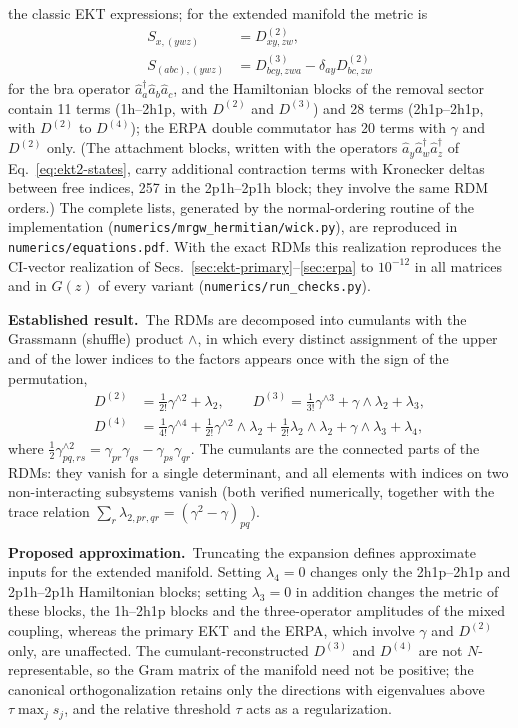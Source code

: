 \documentclass[aip,jcp,reprint,noshowkeys,superscriptaddress]{revtex4-1}
\newcommand{\Established}{\textbf{Established result.}\ }
\newcommand{\Proposed}{\textbf{Proposed approximation.}\ }
\begin{document}
the classic EKT expressions; for the extended manifold the metric is
\begin{align}
  S_{x,(ywz)}&=D^{(2)}_{xy,zw},
  \nonumber\\
  S_{(abc),(ywz)}&=D^{(3)}_{bcy,zwa}-\delta_{ay}D^{(2)}_{bc,zw}
  \label{eq:S-rdm}
\end{align}
for the bra operator $\hat a_a^\dagger\hat a_b\hat a_c$, and the
Hamiltonian blocks of the removal sector contain 11 terms (1h--2h1p,
with $D^{(2)}$ and $D^{(3)}$) and 28 terms (2h1p--2h1p, with $D^{(2)}$ to
$D^{(4)}$); the ERPA double commutator has 20 terms with $\gamma$ and
$D^{(2)}$ only.  (The attachment blocks, written with the operators
$\hat a_y\hat a_w^\dagger\hat a_z^\dagger$ of Eq.~\eqref{eq:ekt2-states},
carry additional contraction terms with Kronecker deltas between free
indices, 257 in the 2p1h--2p1h block; they involve the same RDM orders.)
The complete lists, generated by the normal-ordering routine of the
implementation (\texttt{numerics/mrgw\_hermitian/wick.py}), are reproduced
in \texttt{numerics/equations.pdf}.  With the exact RDMs this realization
reproduces the CI-vector realization of Secs.~\ref{sec:ekt-primary}--\ref{sec:erpa}
to $10^{-12}$ in all matrices and in $G(z)$ of every variant
(\texttt{numerics/run\_checks.py}).

\Established The RDMs are decomposed into cumulants with the Grassmann
(shuffle) product $\wedge$, in which every distinct assignment of the
upper and of the lower indices to the factors appears once with the sign
of the permutation,
\begin{align}
  D^{(2)}&=\tfrac1{2!}\gamma^{\wedge2}+\lambda_2,\qquad
  D^{(3)}=\tfrac1{3!}\gamma^{\wedge3}+\gamma\wedge\lambda_2+\lambda_3,
  \nonumber\\
  D^{(4)}&=\tfrac1{4!}\gamma^{\wedge4}+\tfrac1{2!}\gamma^{\wedge2}\wedge\lambda_2
  +\tfrac1{2!}\lambda_2\wedge\lambda_2+\gamma\wedge\lambda_3+\lambda_4 ,
  \label{eq:cumulants}
\end{align}
where $\tfrac12\gamma^{\wedge2}_{pq,rs}=\gamma_{pr}\gamma_{qs}-\gamma_{ps}\gamma_{qr}$.
The cumulants are the connected parts of the RDMs: they vanish for a
single determinant, and all elements with indices on two non-interacting
subsystems vanish (both verified numerically, together with the trace
relation $\sum_r\lambda_{2,pr,qr}=(\gamma^2-\gamma)_{pq}$).

\Proposed Truncating the expansion defines approximate inputs for the
extended manifold.  Setting $\lambda_4=0$ changes only the 2h1p--2h1p and
2p1h--2p1h Hamiltonian blocks; setting $\lambda_3=0$ in addition changes
the metric of these blocks, the 1h--2h1p blocks and the three-operator
amplitudes of the mixed coupling, whereas the primary EKT and the ERPA,
which involve $\gamma$ and $D^{(2)}$ only, are unaffected.  The
cumulant-reconstructed $D^{(3)}$ and $D^{(4)}$ are not $N$-representable,
so the Gram matrix of the manifold need not be positive; the canonical
orthogonalization retains only the directions with eigenvalues above
$\tau\max_js_j$, and the relative threshold $\tau$ acts as a
regularization.
\end{document}

